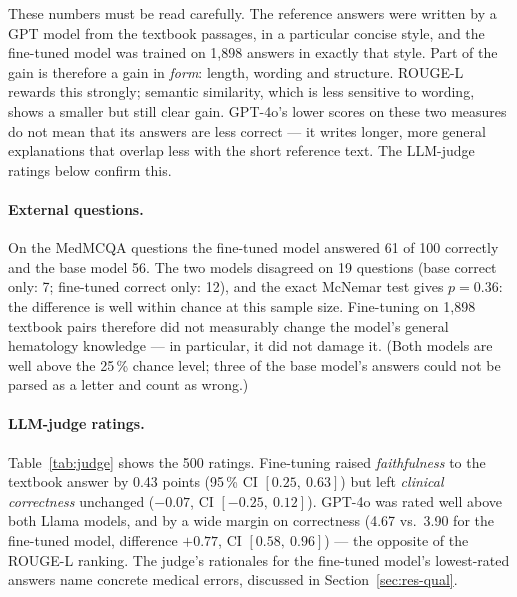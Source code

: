 These numbers must be read carefully. The reference answers were written by a GPT model from the textbook passages, in a particular concise style, and the fine-tuned model was trained on 1{,}898 answers in exactly that style. Part of the gain is therefore a gain in \emph{form}: length, wording and structure. ROUGE-L rewards this strongly; semantic similarity, which is less sensitive to wording, shows a smaller but still clear gain. GPT-4o's lower scores on these two measures do not mean that its answers are less correct --- it writes longer, more general explanations that overlap less with the short reference text. The LLM-judge ratings below confirm this.

\paragraph{External questions.} On the MedMCQA questions the fine-tuned model answered 61 of 100 correctly and the base model 56. The two models disagreed on 19 questions (base correct only: 7; fine-tuned correct only: 12), and the exact McNemar test gives $p = 0.36$: the difference is well within chance at this sample size. Fine-tuning on 1{,}898 textbook pairs therefore did not measurably change the model's general hematology knowledge --- in particular, it did not damage it. (Both models are well above the 25\,\% chance level; three of the base model's answers could not be parsed as a letter and count as wrong.)

\paragraph{LLM-judge ratings.} Table~\ref{tab:judge} shows the 500 ratings. Fine-tuning raised \emph{faithfulness} to the textbook answer by 0.43 points (95\,\% CI $[0.25,\ 0.63]$) but left \emph{clinical correctness} unchanged ($-0.07$, CI $[-0.25,\ 0.12]$). GPT-4o was rated well above both Llama models, and by a wide margin on correctness (4.67 vs.\ 3.90 for the fine-tuned model, difference $+0.77$, CI $[0.58,\ 0.96]$) --- the opposite of the ROUGE-L ranking. The judge's rationales for the fine-tuned model's lowest-rated answers name concrete medical errors, discussed in Section~\ref{sec:res-qual}.

